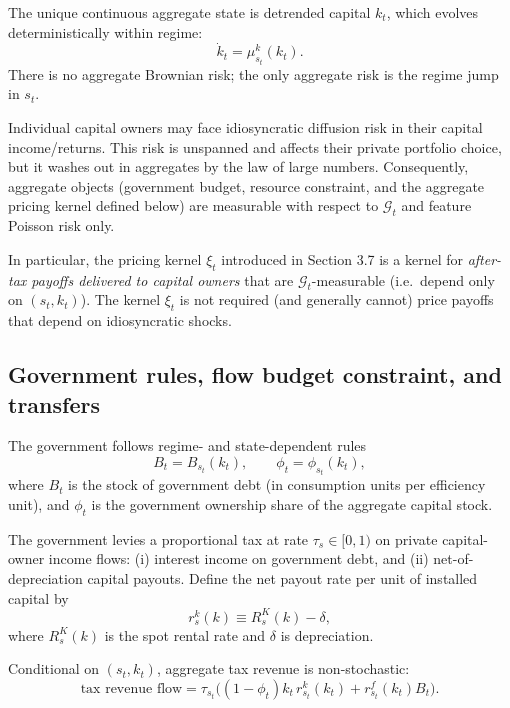 \documentclass{article}
\begin{document}
The unique continuous aggregate state is detrended capital $k_t$, which evolves deterministically within regime:
\begin{equation}
\dot{k}_t = \mu^k_{s_t}(k_t).
\tag{28}
\end{equation}
There is no aggregate Brownian risk; the only aggregate risk is the regime jump in $s_t$.

Individual capital owners may face idiosyncratic diffusion risk in their capital income/returns. This risk is unspanned and affects their private portfolio choice, but it washes out in aggregates by the law of large numbers. Consequently, aggregate objects (government budget, resource constraint, and the aggregate pricing kernel defined below) are measurable with respect to $\mathcal{G}_t$ and feature Poisson risk only.

In particular, the pricing kernel $\xi_t$ introduced in Section 3.7 is a kernel for \emph{after-tax payoffs delivered to capital owners} that are $\mathcal{G}_t$-measurable (i.e.\ depend only on $(s_t,k_t)$). The kernel $\xi_t$ is not required (and generally cannot) price payoffs that depend on idiosyncratic shocks.

\subsection{Government rules, flow budget constraint, and transfers}
The government follows regime- and state-dependent rules
\begin{equation}
B_t = B_{s_t}(k_t), \qquad \phi_t = \phi_{s_t}(k_t),
\tag{29}
\end{equation}
where $B_t$ is the stock of government debt (in consumption units per efficiency unit), and $\phi_t$ is the government ownership share of the aggregate capital stock.

The government levies a proportional tax at rate $\tau_s \in [0,1)$ on private capital-owner income flows: (i) interest income on government debt, and (ii) net-of-depreciation capital payouts. Define the net payout rate per unit of installed capital by
\begin{equation}
r^k_s(k) \equiv R^K_s(k) - \delta,
\tag{30}
\end{equation}
where $R^K_s(k)$ is the spot rental rate and $\delta$ is depreciation.

Conditional on $(s_t,k_t)$, aggregate tax revenue is non-stochastic:
\begin{equation}
\text{tax revenue flow}=\tau_{s_t}\Big((1-\phi_t)k_t\, r^k_{s_t}(k_t) + r^f_{s_t}(k_t) B_t\Big).
\tag{31}
\end{equation}
\end{document}
